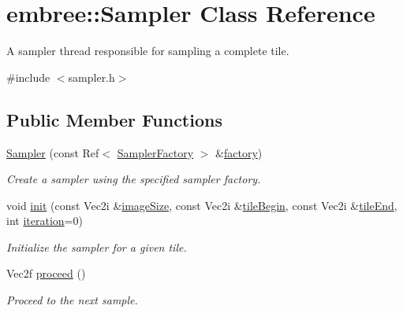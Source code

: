 \hypertarget{classembree_1_1_sampler}{
\section{embree::Sampler Class Reference}
\label{classembree_1_1_sampler}
}


A sampler thread responsible for sampling a complete tile.  




{\ttfamily \#include $<$sampler.h$>$}

\subsection*{Public Member Functions}
\begin{DoxyCompactItemize}
\item 
\hyperlink{classembree_1_1_sampler_a0dd644463856319badfbcaa914f27546}{Sampler} (const Ref$<$ \hyperlink{classembree_1_1_sampler_factory}{SamplerFactory} $>$ \&\hyperlink{classembree_1_1_sampler_a66d739c6b33ea75337cf3fb96c2b3cf5}{factory})
\begin{DoxyCompactList}\small\item\em Create a sampler using the specified sampler factory. \item\end{DoxyCompactList}\item 
void \hyperlink{classembree_1_1_sampler_aa62a4b315a67723685e7950845089247}{init} (const Vec2i \&\hyperlink{classembree_1_1_sampler_ab87a1a43193c03831de1c238b426531d}{imageSize}, const Vec2i \&\hyperlink{classembree_1_1_sampler_abf235b415b0617f18908ab5488b14aab}{tileBegin}, const Vec2i \&\hyperlink{classembree_1_1_sampler_aeab1cdc06154d519f670138ed5d16298}{tileEnd}, int \hyperlink{classembree_1_1_sampler_af6a3139e4ac5ef9e34b3e86c15164fb8}{iteration}=0)
\begin{DoxyCompactList}\small\item\em Initialize the sampler for a given tile. \item\end{DoxyCompactList}\item 
Vec2f \hyperlink{classembree_1_1_sampler_a036f24eff634198119b81c52f53f7322}{proceed} ()
\begin{DoxyCompactList}\small\item\em Proceed to the next sample. \item\end{DoxyCompactList}\item 

\end{DoxyCompactItemize}
